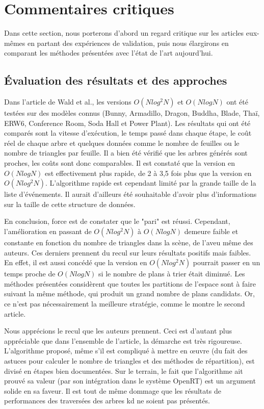 \documentclass[a4paper]{article}
\begin{document}
\section{Commentaires critiques}

Dans cette section, nous porterons d'abord un regard critique sur les articles eux-mêmes en partant des expériences de validation, puis nous élargirons en comparant les méthodes présentées avec l'état de l'art aujourd'hui.

\subsection{Évaluation des résultats et des approches}

Dans l'article de Wald et al., les versions $O(Nlog^2N)$ et $O(NlogN)$ ont été testées sur des modèles connus (Bunny, Armadillo, Dragon, Buddha, Blade, Thaï, ERW6, Conference Room, Soda Hall et Power Plant). Les résultats qui ont été comparés sont la vitesse d'exécution, le temps passé dans chaque étape, le coût réel de chaque arbre et quelques données comme le nombre de feuilles ou le nombre de triangles par feuille. Il a bien été vérifié que les arbres générés sont proches, les coûts sont donc comparables. Il est constaté que la version en $O(NlogN)$ est effectivement plus rapide, de 2 à 3,5 fois plus que la version en $O(Nlog^2N)$. L'algorithme rapide est cependant limité par la grande taille de la liste d'événements. Il aurait d'ailleurs été souhaitable d'avoir plus d'informations sur la taille de cette structure de données.

En conclusion, force est de constater que le "pari" est réussi. Cependant, l'amélioration en passant de $O(Nlog^2N)$ à $O(NlogN)$ demeure faible et constante en fonction du nombre de triangles dans la scène, de l'aveu même des auteurs. Ces derniers prennent du recul sur leurs résultats positifs mais faibles. En effet, il est aussi concédé que la version en $O(Nlog^2N)$ pourrait passer en un temps proche de $O(NlogN)$ si le nombre de plans à trier était diminué. Les méthodes présentées considèrent que toutes les partitions de l'espace sont à faire suivant la même méthode, qui produit un grand nombre de plans candidats. Or, ce n'est pas nécessairement la meilleure stratégie, comme le montre le second article.

Nous apprécions le recul que les auteurs prennent. Ceci est d'autant plus appréciable que dans l'ensemble de l'article, la démarche est très rigoureuse. L'algorithme proposé, même s'il est compliqué à mettre en œuvre (du fait des astuces pour calculer le nombre de triangles et des méthodes de répartition), est divisé en étapes bien documentées. Sur le terrain, le fait que l'algorithme ait prouvé sa valeur (par son intégration dans le système OpenRT) est un argument solide en sa faveur. Il est tout de même dommage que les résultats de performances des traversées des arbres kd ne soient pas présentés.
\end{document}
